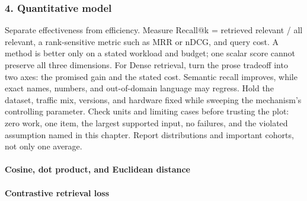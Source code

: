 \subsubsection*{4. Quantitative model}
Separate effectiveness from efficiency. Measure Recall@k = retrieved relevant / all relevant, a rank-sensitive metric such as MRR or nDCG, and query cost. A method is better only on a stated workload and budget; one scalar score cannot preserve all three dimensions.
For Dense retrieval, turn the prose tradeoff into two axes: the promised gain and the stated cost. Semantic recall improves, while exact names, numbers, and out-of-domain language may regress. Hold the dataset, traffic mix, versions, and hardware fixed while sweeping the mechanism's controlling parameter.
Check units and limiting cases before trusting the plot: zero work, one item, the largest supported input, no failures, and the violated assumption named in this chapter. Report distributions and important cohorts, not only one average.
\paragraph{Cosine, dot product, and Euclidean distance}
\paragraph{Contrastive retrieval loss}
